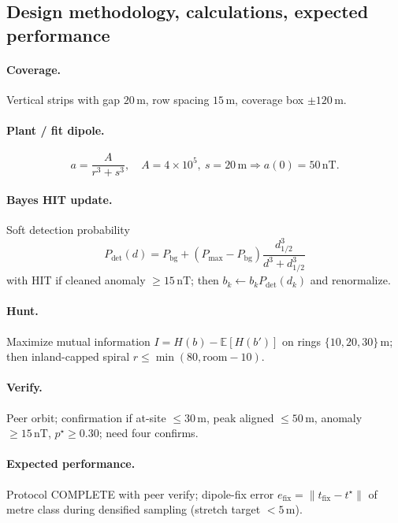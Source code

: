 \documentclass[11pt,a4paper]{article}
\begin{document}
\subsection{Design methodology, calculations, expected performance}
\paragraph{Coverage.} Vertical strips with gap $20\,\mathrm{m}$, row spacing
$15\,\mathrm{m}$, coverage box $\pm120\,\mathrm{m}$.

\paragraph{Plant / fit dipole.}
\[
a=\frac{A}{r^{3}+s^{3}},\quad A=4\times10^{5},\ s=20\,\mathrm{m}
\Rightarrow a(0)=50\,\mathrm{nT}.
\]

\paragraph{Bayes HIT update.} Soft detection probability
\[
P_{\mathrm{det}}(d)=P_{\mathrm{bg}}+(P_{\max}-P_{\mathrm{bg}})
\frac{d_{1/2}^{3}}{d^{3}+d_{1/2}^{3}}
\]
with HIT if cleaned anomaly $\ge15\,\mathrm{nT}$; then
$b_k\leftarrow b_k P_{\mathrm{det}}(d_k)$ and renormalize.

\paragraph{Hunt.} Maximize mutual information $I=H(b)-\mathbb{E}[H(b')]$ on rings
$\{10,20,30\}\,\mathrm{m}$; then inland-capped spiral
$r\le\min(80,\mathrm{room}-10)$.

\paragraph{Verify.} Peer orbit; confirmation if at-site $\le30\,\mathrm{m}$, peak
aligned $\le50\,\mathrm{m}$, anomaly $\ge15\,\mathrm{nT}$, $p^{\star}\ge0.30$;
need four confirms.

\paragraph{Expected performance.} Protocol COMPLETE with peer verify; dipole-fix
error $e_{\mathrm{fix}}=\lVert t_{\mathrm{fix}}-t^{\star}\rVert$ of metre class
during densified sampling (stretch target $<5\,\mathrm{m}$).

\end{document}

